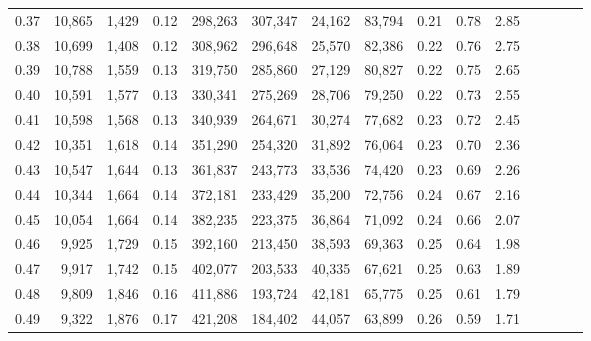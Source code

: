 \begin{tabular}{rrrcrrrrrrrrrrr}
0.37 &  10,865 &  1,429 &                                       0.12 &  298,263 &  307,347 &   24,162 &   83,794 &  0.21 &  0.78 &                         2.85 \\
0.38 &  10,699 &  1,408 &                                       0.12 &  308,962 &  296,648 &   25,570 &   82,386 &  0.22 &  0.76 &                         2.75 \\
0.39 &  10,788 &  1,559 &                                       0.13 &  319,750 &  285,860 &   27,129 &   80,827 &  0.22 &  0.75 &                         2.65 \\
0.40 &  10,591 &  1,577 &                                       0.13 &  330,341 &  275,269 &   28,706 &   79,250 &  0.22 &  0.73 &                         2.55 \\
0.41 &  10,598 &  1,568 &                                       0.13 &  340,939 &  264,671 &   30,274 &   77,682 &  0.23 &  0.72 &                         2.45 \\
0.42 &  10,351 &  1,618 &                                       0.14 &  351,290 &  254,320 &   31,892 &   76,064 &  0.23 &  0.70 &                         2.36 \\
0.43 &  10,547 &  1,644 &                                       0.13 &  361,837 &  243,773 &   33,536 &   74,420 &  0.23 &  0.69 &                         2.26 \\
0.44 &  10,344 &  1,664 &                                       0.14 &  372,181 &  233,429 &   35,200 &   72,756 &  0.24 &  0.67 &                         2.16 \\
0.45 &  10,054 &  1,664 &                                       0.14 &  382,235 &  223,375 &   36,864 &   71,092 &  0.24 &  0.66 &                         2.07 \\
0.46 &   9,925 &  1,729 &                                       0.15 &  392,160 &  213,450 &   38,593 &   69,363 &  0.25 &  0.64 &                         1.98 \\
0.47 &   9,917 &  1,742 &                                       0.15 &  402,077 &  203,533 &   40,335 &   67,621 &  0.25 &  0.63 &                         1.89 \\
0.48 &   9,809 &  1,846 &                                       0.16 &  411,886 &  193,724 &   42,181 &   65,775 &  0.25 &  0.61 &                         1.79 \\
0.49 &   9,322 &  1,876 &                                       0.17 &  421,208 &  184,402 &   44,057 &   63,899 &  0.26 &  0.59 &                         1.71 \\

\end{tabular}
